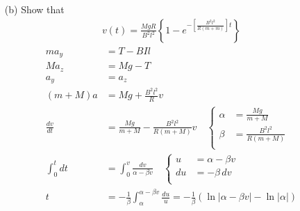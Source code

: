 \documentclass[]{article}
\begin{document}
{\begin{enumerate}
				\paragraph{} From a top-down view, the magnetic field is directed outside of the page perpendicular to the plane of the circuit ($\bm{+\hat{k}}$). As the bar is pulled to the right by the block($\bm{+\hat{j}}$), the electrons in the bar experience a magnetic force. According to the Lorentz force equation $\bm{\vec{F}_B = q\vec{v}} \cross \bm{\vec{B}}$, the magnetic force on each electron is in the positive x direction ($\bm{+\hat{i}}$). The magnetic force causes electrons to accumulate at $\bm{b}$, leaving a net positive charge at $\bm{b}$. Therefore the \textit{current} flows from $\bm{b}$ to $\bm{a}$. \\
			\item[(b)] Show that
			\begin{equation*}
				\begin{split}
					v(t) = \frac{MgR}{B^2 l^2} \left\{ 1 - e^{-\left[ \frac{B^2 l^2}{R(m+m)} \right]t} \right\}
				\end{split}
			\end{equation*}
				\begin{equation*}
					\begin{split}
						ma_y &= T - BIl \\
						Ma_z &= Mg - T \\
						a_y &= a_z \\
						(m+M)a &= Mg + \frac{B^2l^2}{R}v \\
						\frac{dv}{dt} &= \frac{Mg}{m+M} - \frac{B^2 l^2}{R(m+M)}v
							\quad
							\begin{cases}
								\alpha &= \frac{Mg}{m+M} \\
								\beta &= \frac{B^2 l^2}{R(m+M)} \\
							\end{cases} \\
						\int_{0}^{t} dt &= \int_{0}^{v} \frac{dv}{\alpha - \beta v}
							\quad
							\begin{cases}
								u &= \alpha - \beta v \\
								du &= -\beta \, dv \\
							\end{cases} \\
						t &= -\frac{1}{\beta} \int_{\alpha}^{\alpha - \beta v} \frac{du}{u}
						= -\frac{1}{\beta} \left( \ln\left| \alpha - \beta v \right| - \ln\left| \alpha \right| \right) \\

\end{split}
\end{equation*}
\end{enumerate}}
\end{document}
